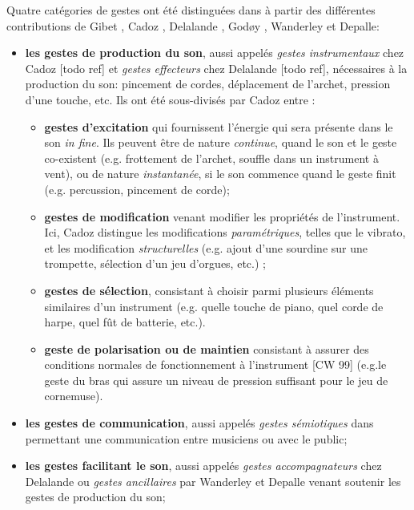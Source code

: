 Quatre catégories de gestes ont été distinguées dans \cite{jensenius_musical_2010} à partir des différentes contributions de Gibet \cite{gibet_codage_1987}, Cadoz \cite{cadoz_gesture_2000}, Delalande \cite{delalande_geste_1988}, Godøy \cite{godoy_exploring_2006}, Wanderley et Depalle\cite{wanderley_gestural_2004}:

\vspace{-1em}
\begin{itemize}[noitemsep]
\item \textbf{les gestes de production du son}, aussi appelés \textit{gestes instrumentaux} chez Cadoz [todo ref]  et \textit{gestes effecteurs} chez Delalande [todo ref], nécessaires à la production du son: pincement de cordes, déplacement de l'archet, pression d'une touche, etc. Ils ont été sous-divisés par Cadoz \cite{cadoz_instrumental_1988} entre :
	\vspace{-1em}
	\begin{itemize}[noitemsep]
		\item \textbf{gestes d'excitation} qui fournissent l'énergie qui sera présente dans le son \textit{in fine}. Ils peuvent être de nature \textit{continue}, quand le son et le geste co-existent (e.g. frottement de l'archet, souffle dans un instrument à vent), ou de nature \textit{instantanée}, si le son commence quand le geste finit (e.g. percussion, pincement de corde);
		\item \textbf{gestes de modification} venant modifier les propriétés de l'instrument. Ici, Cadoz distingue les modifications \textit{paramétriques}, telles que le vibrato, et les modification \textit{structurelles} (e.g. ajout d'une sourdine sur une trompette, sélection d'un jeu d'orgues, etc.) ;
		\item \textbf{gestes de sélection}, consistant à choisir parmi plusieurs éléments similaires d'un instrument (e.g. quelle touche de piano, quel corde de harpe, quel fût de batterie, etc.).
		\item \textbf{geste de polarisation ou de maintien} consistant à assurer des conditions normales de fonctionnement à l'instrument [CW 99] (e.g.le geste du bras qui assure un niveau de pression suffisant pour le jeu de cornemuse).
	\end{itemize}
\item \textbf{les gestes de communication}, aussi appelés \textit{gestes sémiotiques} dans \cite{cadoz_gesture_2000} permettant une communication entre musiciens ou avec le public;
\item \textbf{les gestes facilitant le son}, aussi appelés \textit{gestes accompagnateurs} chez Delalande \cite{delalande_geste_1988} ou \textit{gestes ancillaires} par Wanderley et Depalle \cite{wanderley_gestural_2004} venant soutenir les gestes de production du son;

\end{itemize}
